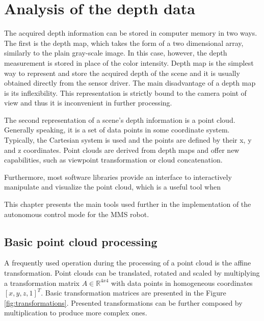 \chapter{Analysis of the depth data}
\label{cha:analysis}

The acquired depth information can be stored in computer memory in two ways. The first is the depth map, which takes the form of a two dimensional array, similarly to the plain gray-scale image. In this case, however, the depth measurement is stored in place of the color intensity. Depth map is the simplest way to represent and store the acquired depth of the scene and it is usually obtained directly from the sensor driver. The main disadvantage of a depth map is its inflexibility. This representation is strictly bound to the camera point of view and thus it is inconvenient in further processing.

The second representation of a scene's depth information is a point cloud. Generally speaking, it is a set of data points in some coordinate system. Typically, the Cartesian system is used and the points are defined by their x, y and z coordinates. Point clouds are derived from depth maps and offer new capabilities, such as viewpoint transformation or cloud concatenation.

 Furthermore, most software libraries provide an interface to interactively manipulate and visualize the point cloud, which is a useful tool when 

This chapter presents the main tools used further in the implementation of the autonomous control mode for the MMS robot.


\section{Basic point cloud processing}
\label{sec:pointclouds}

A frequently used operation during the processing of a point cloud is the affine transformation. Point clouds can be translated, rotated and scaled by multiplying a transformation matrix $A \in \mathbb{R}^{4x4}$ with data points in homogeneous coordinates $[x,y,z,1]^T$. Basic transformation matrices are presented in the Figure \ref{fig:transformations}. Presented transformations can be further composed by multiplication to produce more complex ones.

